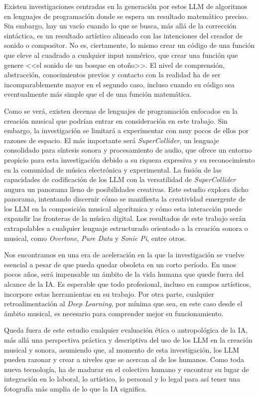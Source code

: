 Existen investigaciones centradas en la generación por estos LLM de algoritmos en lenguajes de programación donde se espera un resultado matemático preciso. Sin embargo, hay un vacío cuando lo que se busca, más allá de la corrección sintáctica, es un resultado artístico alineado con las intenciones del creador de sonido o compositor. No es, ciertamente, lo mismo crear un código de una función que eleve al cuadrado a cualquier input numérico, que crear una función que genere <<el sonido de un bosque en otoño>>. El nivel de comprensión, abstracción, conocimientos previos y contacto con la realidad ha de ser incomparablemente mayor en el segundo caso, incluso cuando su código sea eventualmente más simple que el de una función matemática.

Como se verá, existen decenas de lenguajes de programación enfocados en la creación musical que podrían entrar en consideración en este trabajo. Sin embargo, la investigación se limitará a experimentar con muy pocos de ellos por razones de espacio. El más importante será \textit{SuperCollider}, un lenguaje consolidado para síntesis sonora y procesamiento de audio, que ofrece un entorno propicio para esta investigación debido a su riqueza expresiva y su reconocimiento en la comunidad de música electrónica y experimental. La fusión de las capacidades de codificación de los LLM con la versatilidad de \textit{SuperCollider} augura un panorama lleno de posibilidades creativas. Este estudio explora dicho panorama, intentando discernir cómo se manifiesta la creatividad emergente de los LLM en la composición musical algorítmica y cómo esta interacción puede expandir las fronteras de la música digital. Los resultados de este trabajo serán extrapolables a cualquier lenguaje estructurado orientado a la creación sonora o musical, como \textit{Overtone}, \textit{Pure Data} y \textit{Sonic Pi}, entre otros.

Nos encontramos en una era de aceleración en la que la investigación se vuelve esencial a pesar de que pueda quedar obsoleta en un corto período. En unos pocos años, será impensable un ámbito de la vida humana que quede fuera del alcance de la IA. Es esperable que todo profesional, incluso en campos artísticos, incorpore estas herramientas en su trabajo. Por otra parte, cualquier retroalimentación al \textit{Deep Learning}, por mínima que sea, en este caso desde el ámbito musical, es necesario para comprender mejor su funcionamiento.

Queda fuera de este estudio cualquier evaluación ética o antropológica de la IA, más allá una perspectiva práctica y descriptiva del uso de los LLM en la creación musical y sonora, asumiendo que, al momento de esta investigación, los LLM pueden razonar y crear a niveles que se acercan al de los humanos. Como toda nueva tecnología, ha de madurar en el colectivo humano y encontrar su lugar de integración en lo laboral, lo artístico, lo personal y lo legal para así tener una fotografía más amplia de lo que la IA significa. 


